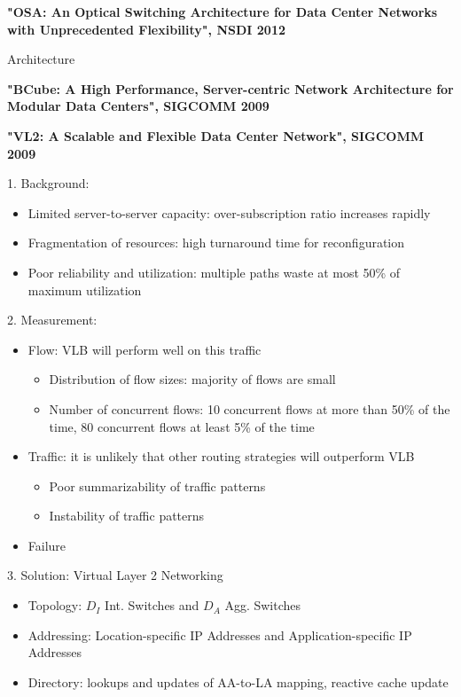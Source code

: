 \documentclass[journal,onecolumn,11pt]{IEEEtran}
\begin{document}
\textbf{"OSA: An Optical Switching Architecture for Data Center Networks with Unprecedented Flexibility", NSDI 2012}

Architecture

\textbf{"BCube: A High Performance, Server-centric Network Architecture for Modular Data Centers", SIGCOMM 2009}

\textbf{"VL2: A Scalable and Flexible Data Center Network", SIGCOMM 2009}

1. Background:
\begin{itemize}
  \item Limited server-to-server capacity: over-subscription ratio increases rapidly
  \item Fragmentation of resources: high turnaround time for reconfiguration
  \item Poor reliability and utilization: multiple paths waste at most 50\% of maximum utilization
\end{itemize}

2. Measurement:
\begin{itemize}
  \item Flow: VLB will perform well on this traffic
  \begin{itemize}
    \item Distribution of flow sizes: majority of flows are small
    \item Number of concurrent flows: 10 concurrent flows at more than 50\% of the time, 80 concurrent flows at least 5\% of the time
  \end{itemize}
  \item Traffic: it is unlikely that other routing strategies will outperform VLB
  \begin{itemize}
    \item Poor summarizability of traffic patterns
    \item Instability of traffic patterns
  \end{itemize}
  \item Failure
\end{itemize}

3. Solution: Virtual Layer 2 Networking
\begin{itemize}
  \item Topology: $D_I$ Int. Switches and $D_A$ Agg. Switches
  \item Addressing: Location-specific IP Addresses and Application-specific IP Addresses
  \item Directory: lookups and updates of AA-to-LA mapping, reactive cache update
\end{itemize}
\end{document}
